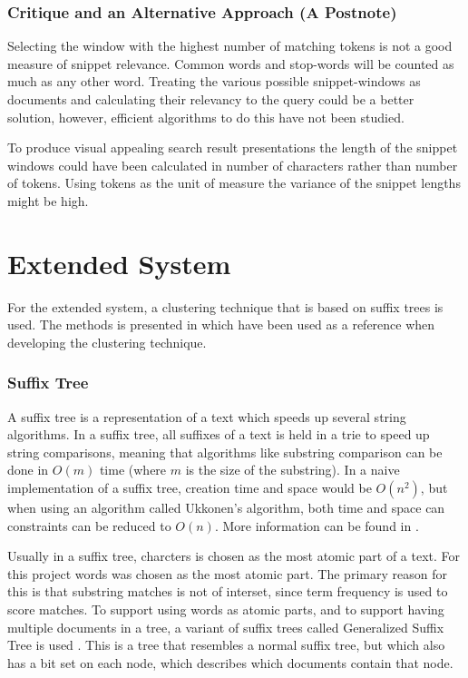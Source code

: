 \subsubsection{Critique and an Alternative Approach (A Postnote)}
Selecting the window with the highest number of matching tokens is not a good measure of snippet relevance. Common words and stop-words will be counted as much as any other word. Treating the various possible snippet-windows as documents and calculating their relevancy to the query could be a better solution, however, efficient algorithms to do this have not been studied. 

To produce visual appealing search result presentations the length of the snippet windows could have been calculated in number of characters rather than number of tokens. Using tokens as the unit of measure the variance of the snippet lengths might be high. 

\section{Extended System}

For the extended system,  a clustering technique that is based on suffix trees is used. The methods is presented in \cite{zamir} which have been used as a reference when developing the clustering technique.

\subsubsection{Suffix Tree} 

A suffix tree is a representation of a text which speeds up several string algorithms. In a suffix tree, all suffixes of a text is held in  a trie to speed up string comparisons, meaning that algorithms like substring comparison can be done in $O(m)$ time (where $m$ is the size of the substring). In a naive implementation of a suffix tree, creation time and space would be $O(n^2)$, but when using an algorithm called Ukkonen's algorithm, both time and space can constraints can be reduced to $O(n)$. More information can be found in \cite{suffixtreebook}.

Usually in a suffix tree, charcters is chosen as the most atomic part of a text. For this project words was chosen as the most atomic part. The primary reason for this is that substring matches is not of interset, since term frequency is used to score matches. To support using words as atomic parts, and to support having multiple documents in a tree, a variant of suffix trees called Generalized Suffix Tree is used . This is a tree that resembles a normal suffix tree, but which also has a bit set on each node, which describes which documents contain that node. 

